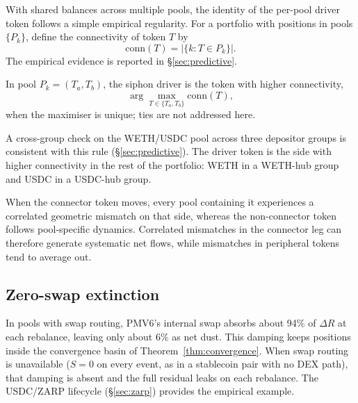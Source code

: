 \documentclass{manuscript}
\begin{document}
With shared balances across multiple pools, the identity of the per-pool driver token follows a simple empirical regularity. For a portfolio with positions in pools $\{P_k\}$, define the connectivity of token $T$ by
\[
\mathrm{conn}(T) = \bigl|\{k : T \in P_k\}\bigr|.
\]
The empirical evidence is reported in \S\ref{sec:predictive}.

\begin{conjecture}
In pool $P_k = (T_a, T_b)$, the siphon driver is the token with higher connectivity,
\[
\arg\max_{T \in \{T_a, T_b\}} \mathrm{conn}(T),
\]
when the maximiser is unique; ties are not addressed here.
\end{conjecture}

A cross-group check on the WETH/USDC pool across three depositor groups is consistent with this rule (\S\ref{sec:predictive}). The driver token is the side with higher connectivity in the rest of the portfolio: WETH in a WETH-hub group and USDC in a USDC-hub group.

When the connector token moves, every pool containing it experiences a correlated geometric mismatch on that side, whereas the non-connector token follows pool-specific dynamics. Correlated mismatches in the connector leg can therefore generate systematic net flows, while mismatches in peripheral tokens tend to average out.

\subsection{Zero-swap extinction}\label{sec:extinction}

In pools with swap routing, PMV6's internal swap absorbs about 94\% of $\Delta R$ at each rebalance, leaving only about 6\% as net dust. This damping keeps positions inside the convergence basin of Theorem~\ref{thm:convergence}. When swap routing is unavailable ($S = 0$ on every event, as in a stablecoin pair with no DEX path), that damping is absent and the full residual leaks on each rebalance. The USDC/ZARP lifecycle (\S\ref{sec:zarp}) provides the empirical example.
\end{document}

